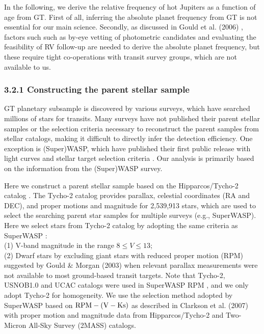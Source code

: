 \documentclass[twocolumn]{pnas-new}
\begin{document}
In the following, we derive the relative frequency of hot Jupiters as a function of age from GT.  First of all,  inferring the absolute planet frequency from GT is not essential for our main science. Secondly, as discussed in Gould et al. (2006) \citep{2006AcA....56....1G}, factors such such as by-eye vetting of photometric candidates and evaluating the feasibility of RV follow-up are needed to derive the absolute planet frequency, but these require tight co-operations with transit survey groups, which are not available to us.

\subsubsection*{3.2.1 Constructing the parent stellar sample}
\label{sec.obs.GBTS.sample}
GT planetary subsample is discovered by various surveys, which have searched millions of stars for transits. Many surveys have not published their parent stellar samples or the selection criteria necessary to reconstruct the parent samples from stellar catalogs, making it difficult to directly infer the detection efficiency. One exception is (Super)WASP, which have published their first public release with light curves \citep{2010A&A...520L..10B} and stellar target selection criteria \citep{2007ASPC..366..187W, 2007MNRAS.381..851C}. Our analysis is primarily based on the information from the (Super)WASP survey.

Here we construct a parent stellar sample based on the Hipparcos/Tycho-2 catalog \citep{2000A&A...355L..27H}.
The Tycho-2 catalog provides parallax, celestial coordinates (RA and DEC), and proper motions and magnitude for 2,539,913 stars, which are used to select the searching parent star samples for multiple surveys (e.g., SuperWASP).
Here we select stars from Tycho-2 catalog by adopting the same criteria as SuperWASP \citep{2007ASPC..366..187W}: \\
(1) V-band magnitude in the range $8 \leq V \leq 13$; \\
(2) Dwarf stars by excluding giant stars with reduced proper motion (RPM) suggested by Gould \& Morgan (2003) \citep{2003ApJ...585.1056G} when relevant parallax measurements were not available to most ground-based transit targets.  Note that Tycho-2, USNOB1.0 and UCAC catalogs were used in SuperWASP RPM \citep{2007ASPC..366..187W}, and we only adopt Tycho-2 for homogeneity.   
We use the selection method adopted by SuperWASP based on $\rm RPM-(V-Ks)$ as described in Clarkson et al. (2007) \citep{2007MNRAS.381..851C} with proper motion and magnitude data from Hipparcos/Tycho-2 \citep{2000A&A...355L..27H} and Two-Micron All-Sky Survey (2MASS) catalogs.
\end{document}
